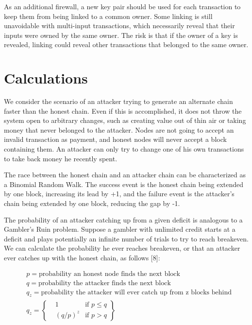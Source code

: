 \documentclass{article}
\begin{document}


As an additional firewall, a new key pair should be used for each transaction to keep them from being linked to a common
owner.
Some linking is still unavoidable with multi-input transactions,
which necessarily reveal that their inputs were owned by the same owner.
The risk is that if the owner of a key is revealed,
linking could reveal other transactions that belonged to the same owner.

\section{Calculations}\label{sec:calculations}
We consider the scenario of an attacker trying to generate an alternate chain faster than the honest
chain. Even if this is accomplished, it does not throw the system open to arbitrary changes, such
as creating value out of thin air or taking money that never belonged to the attacker. Nodes are
not going to accept an invalid transaction as payment, and honest nodes will never accept a block
containing them. An attacker can only try to change one of his own transactions to take back
money he recently spent.

The race between the honest chain and an attacker chain can be characterized as a Binomial
Random Walk. The success event is the honest chain being extended by one block, increasing its
lead by +1, and the failure event is the attacker's chain being extended by one block, reducing the
gap by -1.

The probability of an attacker catching up from a given deficit is analogous to a Gambler's
Ruin problem. Suppose a gambler with unlimited credit starts at a deficit and plays potentially an
infinite number of trials to try to reach breakeven. We can calculate the probability he ever
reaches breakeven, or that an attacker ever catches up with the honest chain, as follows [8]:

\[
    \begin{aligned}
        & p = \text{probability an honest node finds the next block} \\
        & q = \text{probability the attacker finds the next block} \\
        & q_z = \text{probability the attacker will ever catch up from z blocks behind} \\
        & q_z = \left\{\begin{aligned}
                &1 & \text{if } p \le q \\
                &{(q / p)}^z & \text{if } p > q
                \end{aligned}\right\}
    \end{aligned}
\]
\end{document}
